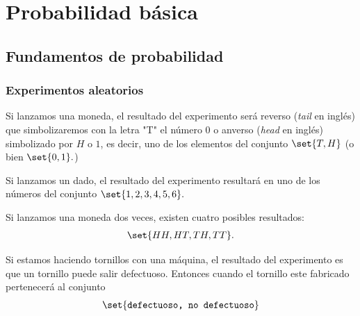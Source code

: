 \chapter{Probabilidad básica}


\section{Fundamentos de probabilidad}

\subsection{Experimentos aleatorios}

 \begin{ejemplo}
  \label{exmp:0.1.1}
  Si lanzamos una moneda, el resultado del experimento será reverso (\emph{tail} en inglés) que simbolizaremos con la letra "T" el número $0$ o anverso (\emph{head} en inglés) simbolizado por $H$ o $1$, es decir, uno de los elementos del conjunto $\set{T,H}$ (o bien $\set{0,1}.$)
 \end{ejemplo}



 \begin{ejemplo}
  \label{exmp:0.1.2}
  Si lanzamos un dado, el resultado del experimento resultará en uno de los números del conjunto $\set{1,2,3,4,5,6}.$
 \end{ejemplo}



 \begin{ejemplo}
  \label{exmp:0.1.3}
  Si lanzamos una moneda dos veces, existen cuatro posibles resultados:
  \begin{align*}
   \set{HH,HT,TH,TT}.
  \end{align*}

 \end{ejemplo}



 \begin{ejemplo}
  \label{exmp:0.1.4}
  Si estamos haciendo tornillos con una máquina, el resultado del experimento es que un tornillo puede salir defectuoso. Entonces cuando el tornillo este fabricado pertenecerá al conjunto
  \begin{align*}
   \set{\texttt{defectuoso, no defectuoso}}
  \end{align*}

 \end{ejemplo}



